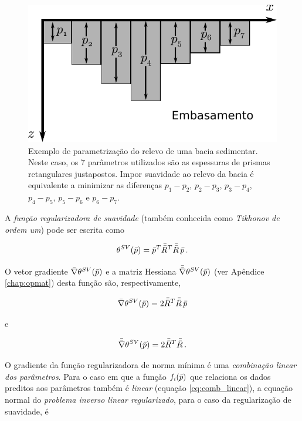 \begin{example}
\begin{figure}
    \centering
    \includegraphics[scale=1]{figs/basin-smoothness}
    \caption{Exemplo de parametrização do relevo de uma bacia sedimentar.
    Neste caso, os 7 parâmetros utilizados são as espessuras de prismas
    retangulares justapostos. Impor suavidade ao relevo da bacia é equivalente
    a minimizar as diferenças $p_1 - p_2$, $p_2 - p_3$, $p_3 - p_4$, $p_4 - p_5$,
    $p_5 - p_6$ e $p_6 - p_7$.}
    \label{fig:basin-smoothness}
\end{figure}

\end{example}

\indent A {\it função regularizadora de suavidade} (também conhecida como
{\it Tikhonov de ordem um}) pode ser escrita como 

\begin{equation}
\theta^{SV}(\bar{p}) = \bar{p}^T \bar{\bar{R}}^T \bar{\bar{R}}\thinspace\bar{p} \thinspace .
\label{eq:suavidade}
\end{equation}

\noindent O vetor gradiente $\bar{\nabla}\theta^{SV}(\bar{p})$ e a matriz Hessiana
$\bar{\bar{\nabla}}\theta^{SV}(\bar{p})$ (ver Apêndice \ref{chap:opmat}) desta função
são, respectivamente,

\begin{equation}
\bar{\nabla}\theta^{SV}(\bar{p}) = 2\bar{\bar{R}}^T \bar{\bar{R}}\thinspace\bar{p}
\end{equation}

\noindent e

\begin{equation}
\bar{\bar{\nabla}}\theta^{SV}(\bar{p}) = 2\bar{\bar{R}}^T \bar{\bar{R}} \thinspace .
\end{equation}

\indent O gradiente da função regularizadora de norma mínima é uma
{\it combinação linear dos parâmetros}.
Para o caso em que a função $f_i(\bar{p})$ que relaciona
os dados preditos aos parâmetros também é {\it linear} (equação \ref{eq:comb_linear}),
a equação normal do {\it problema inverso linear regularizado},
para o caso da regularização de suavidade, é

